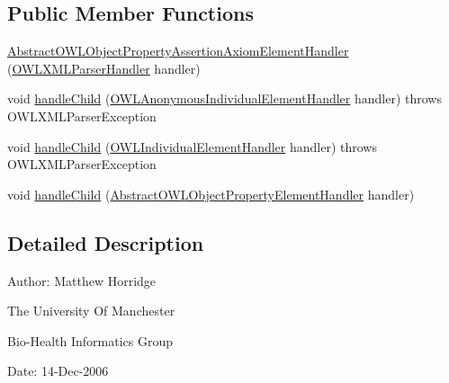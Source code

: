 \subsection*{Public Member Functions}
\begin{DoxyCompactItemize}
\item 
\hyperlink{classorg_1_1coode_1_1owlapi_1_1owlxmlparser_1_1_abstract_o_w_l_object_property_assertion_axiom_element_handler_a072e8bf196fd453b41bff7b97b4b043a}{Abstract\-O\-W\-L\-Object\-Property\-Assertion\-Axiom\-Element\-Handler} (\hyperlink{classorg_1_1coode_1_1owlapi_1_1owlxmlparser_1_1_o_w_l_x_m_l_parser_handler}{O\-W\-L\-X\-M\-L\-Parser\-Handler} handler)
\item 
void \hyperlink{classorg_1_1coode_1_1owlapi_1_1owlxmlparser_1_1_abstract_o_w_l_object_property_assertion_axiom_element_handler_a3a0e168f8c63299f3b09604eede41a7b}{handle\-Child} (\hyperlink{classorg_1_1coode_1_1owlapi_1_1owlxmlparser_1_1_o_w_l_anonymous_individual_element_handler}{O\-W\-L\-Anonymous\-Individual\-Element\-Handler} handler)  throws O\-W\-L\-X\-M\-L\-Parser\-Exception 
\item 
void \hyperlink{classorg_1_1coode_1_1owlapi_1_1owlxmlparser_1_1_abstract_o_w_l_object_property_assertion_axiom_element_handler_a49d2ef2c84e13191be195d75a235d122}{handle\-Child} (\hyperlink{classorg_1_1coode_1_1owlapi_1_1owlxmlparser_1_1_o_w_l_individual_element_handler}{O\-W\-L\-Individual\-Element\-Handler} handler)  throws O\-W\-L\-X\-M\-L\-Parser\-Exception 
\item 
void \hyperlink{classorg_1_1coode_1_1owlapi_1_1owlxmlparser_1_1_abstract_o_w_l_object_property_assertion_axiom_element_handler_a9e887a7247ec8f36b4553e95d4f0b161}{handle\-Child} (\hyperlink{classorg_1_1coode_1_1owlapi_1_1owlxmlparser_1_1_abstract_o_w_l_object_property_element_handler}{Abstract\-O\-W\-L\-Object\-Property\-Element\-Handler} handler)
\end{DoxyCompactItemize}


\subsection{Detailed Description}
Author\-: Matthew Horridge\par
 The University Of Manchester\par
 Bio-\/\-Health Informatics Group\par
 Date\-: 14-\/\-Dec-\/2006\par
\par
 

